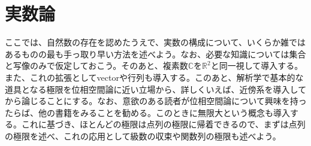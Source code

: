 \documentclass[a4paper]{jsarticle}
\begin{document}
\section{実数論}
ここでは、自然数の存在を認めたうえで、実数の構成について、いくらか雑ではあるものの最も手っ取り早い方法を述べよう。なお、必要な知識については集合と写像のみで仮定しておこう。そのあと、複素数$\mathbb{C}$を$\mathbb{R}^2$と同一視して導入する。また、これの拡張としてvectorや行列も導入する。このあと、解析学で基本的な道具となる極限を位相空間論に近い立場から、詳しくいえば、近傍系を導入してから論じることにする。なお、意欲のある読者が位相空間論について興味を持ったらば、他の書籍をみることを勧める。このときに無限大という概念も導入する。これに基づき、ほとんどの極限は点列の極限に帰着できるので、まずは点列の極限を述べ、これの応用として級数の収束や関数列の極限も述べよう。
\end{document}
